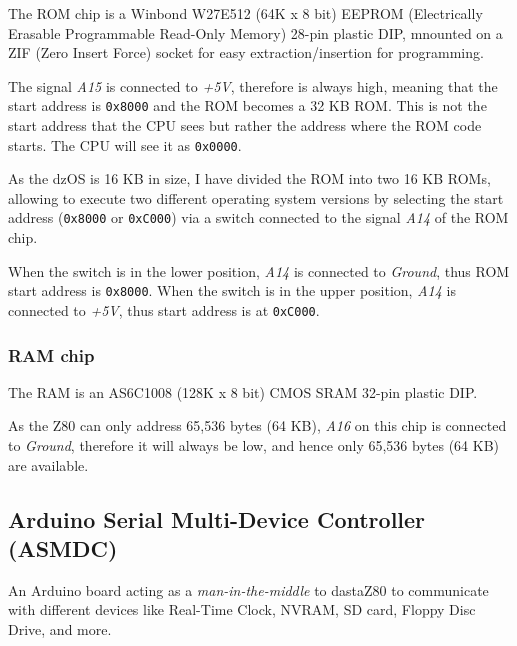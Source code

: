 \documentclass[a4paper,11pt]{article}
\begin{document}
    The ROM chip is a Winbond W27E512 (64K x 8 bit) EEPROM (Electrically Erasable
    Programmable Read-Only Memory) 28-pin plastic DIP, mnounted on a ZIF (Zero
    Insert Force) socket for easy extraction/insertion for programming.

    The signal \textit{A15} is connected to \textit{+5V}, therefore is always
    high, meaning that the start address is \texttt{0x8000} and the ROM becomes
    a 32 KB ROM. This is not the start address that the CPU sees but rather the
    address where the ROM code starts. The CPU will see it as \texttt{0x0000}.

    As the dzOS is 16 KB in size, I have divided the ROM into two 16 KB ROMs, 
    allowing to execute two different operating system versions by selecting the
    start address (\texttt{0x8000} or \texttt{0xC000}) via a switch connected to
    the signal \textit{A14} of the ROM chip.

    When the switch is in the lower position, \textit{A14} is connected to 
    \textit{Ground}, thus ROM start address is \texttt{0x8000}. When the switch
    is in the upper position, \textit{A14} is connected to \textit{+5V}, thus
    start address is at \texttt{0xC000}.

    \subsubsection{RAM chip}

    The RAM is an AS6C1008 (128K x 8 bit) CMOS SRAM 32-pin plastic DIP.

    As the Z80 can only address 65,536 bytes (64 KB), \textit{A16} on this chip
    is connected to \textit{Ground}, therefore it will always be low, and hence
    only 65,536 bytes (64 KB) are available.

    \subsection{ Arduino Serial Multi-Device Controller (ASMDC)}
    \label{asmdc}

    An Arduino board acting as a \textit{man-in-the-middle} to dastaZ80 to
    communicate with different devices like Real-Time Clock, NVRAM, SD card,
    Floppy Disc Drive, and more.
\end{document}
